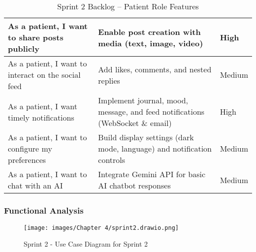 \begin{table}[H]
\begin{tabular}{|p{4.2cm}|p{7.2cm}|p{2.2cm}|}
As a patient, I want to share posts publicly & Enable post creation with media (text, image, video) & High \\
\hline
As a patient, I want to interact on the social feed & Add likes, comments, and nested replies & Medium \\
\hline
As a patient, I want timely notifications & Implement journal, mood, message, and feed notifications (WebSocket \& email) & High \\
\hline
As a patient, I want to configure my preferences & Build display settings (dark mode, language) and notification controls & Medium \\
\hline
As a patient, I want to chat with an AI & Integrate Gemini API for basic AI chatbot responses & Medium \\
\hline
\end{tabular}
\caption{Sprint 2 Backlog -- Patient Role Features}
\end{table}


\subsubsection{Functional Analysis}
\begin{figure}[H]
    \centering
    \texttt{[image: images/Chapter 4/sprint2.drawio.png]}
    \caption{Sprint 2 - Use Case Diagram for Sprint 2}
    \label{fig:use_case_patient}
\end{figure}


